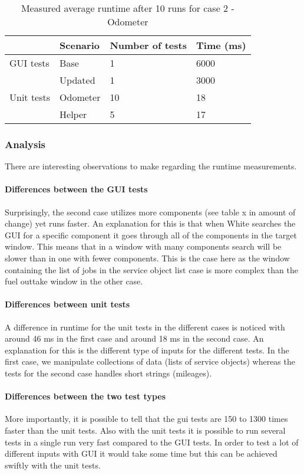 \documentclass{article}
\begin{document}
			\begin{table}[h!]
				\begin{tabular}{l |l |l l}
				        & Scenario & Number of tests & Time (ms)\\
				\hline
				GUI tests & Base     & 1           & 6000 \\
				           & Updated  & 1    		& 3000 \\
				\hline
				Unit tests & Odometer & 10         & 18 \\
				 		& Helper      & 5           & 17 \\
				\end{tabular}
				\caption{Measured average runtime after 10 runs for case 2 - Odometer}
			\end{table}

			\subsubsection{Analysis}
			There are interesting observations to make regarding the runtime measurements. 

			\paragraph{Differences between the GUI tests}
			Surprisingly, the second case utilizes more components (see table x in amount of change) yet runs faster. An explanation for this is that when White searches the GUI for a specific component it goes through all of the components in the target window. This means that in a window with many components search will be slower than in one with fewer components. This is the case here as the window containing the list of jobs in the service object list case is more complex than the fuel outtake window in the other case.

			\paragraph{Differences between unit tests}
			A difference in runtime for the unit tests in the different cases is noticed with around 46 ms in the first case and around 18 ms in the second case. An explanation for this is the different type of inputs for the different tests. In the first case, we manipulate collections of data (lists of service objects) whereas the tests for the second case handles short strings (mileages).

			\paragraph{Differences between the two test types}			
			More importantly, it is possible to tell that the gui tests are 150 to 1300 times faster than the unit tests. Also with the unit tests it is possible to run several tests in a single run very fast compared to the GUI tests. In order to test a lot of different inputs with GUI it would take some time but this can be achieved swiftly with the unit tests.
\end{document}
